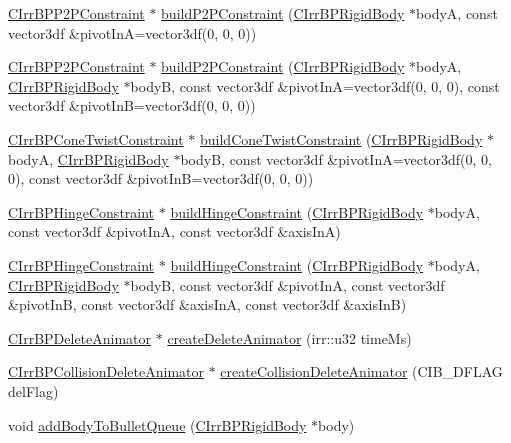 \begin{DoxyCompactItemize}
\item 
\hyperlink{class_c_irr_b_p_p2_p_constraint}{CIrrBPP2PConstraint} $\ast$ \hyperlink{class_c_irr_b_p_manager_a19a7a9108ded5c076d307efdb390d58a}{buildP2PConstraint} (\hyperlink{class_c_irr_b_p_rigid_body}{CIrrBPRigidBody} $\ast$bodyA, const vector3df \&pivotInA=vector3df(0, 0, 0))
\item 
\hyperlink{class_c_irr_b_p_p2_p_constraint}{CIrrBPP2PConstraint} $\ast$ \hyperlink{class_c_irr_b_p_manager_a1a2dc64a93a8770dfed3ba7f77972c70}{buildP2PConstraint} (\hyperlink{class_c_irr_b_p_rigid_body}{CIrrBPRigidBody} $\ast$bodyA, \hyperlink{class_c_irr_b_p_rigid_body}{CIrrBPRigidBody} $\ast$bodyB, const vector3df \&pivotInA=vector3df(0, 0, 0), const vector3df \&pivotInB=vector3df(0, 0, 0))
\item 
\hyperlink{class_c_irr_b_p_cone_twist_constraint}{CIrrBPConeTwistConstraint} $\ast$ \hyperlink{class_c_irr_b_p_manager_ae6c1ebbc11dec61a856bcc7b5c6394ce}{buildConeTwistConstraint} (\hyperlink{class_c_irr_b_p_rigid_body}{CIrrBPRigidBody} $\ast$bodyA, \hyperlink{class_c_irr_b_p_rigid_body}{CIrrBPRigidBody} $\ast$bodyB, const vector3df \&pivotInA=vector3df(0, 0, 0), const vector3df \&pivotInB=vector3df(0, 0, 0))
\item 
\hyperlink{class_c_irr_b_p_hinge_constraint}{CIrrBPHingeConstraint} $\ast$ \hyperlink{class_c_irr_b_p_manager_a87b2610eaba14775ac81992ff71ab436}{buildHingeConstraint} (\hyperlink{class_c_irr_b_p_rigid_body}{CIrrBPRigidBody} $\ast$bodyA, const vector3df \&pivotInA, const vector3df \&axisInA)
\item 
\hyperlink{class_c_irr_b_p_hinge_constraint}{CIrrBPHingeConstraint} $\ast$ \hyperlink{class_c_irr_b_p_manager_a8a61e921b487d6249e46022b6e9b5ccf}{buildHingeConstraint} (\hyperlink{class_c_irr_b_p_rigid_body}{CIrrBPRigidBody} $\ast$bodyA, \hyperlink{class_c_irr_b_p_rigid_body}{CIrrBPRigidBody} $\ast$bodyB, const vector3df \&pivotInA, const vector3df \&pivotInB, const vector3df \&axisInA, const vector3df \&axisInB)
\item 
\hyperlink{class_c_irr_b_p_delete_animator}{CIrrBPDeleteAnimator} $\ast$ \hyperlink{class_c_irr_b_p_manager_a34d992b091c917aa9a0febddadf26141}{createDeleteAnimator} (irr::u32 timeMs)
\item 
\hyperlink{class_c_irr_b_p_collision_delete_animator}{CIrrBPCollisionDeleteAnimator} $\ast$ \hyperlink{class_c_irr_b_p_manager_a868af77531e0eb62d14ee060d2c91158}{createCollisionDeleteAnimator} (CIB\_\-DFLAG delFlag)
\item 
void \hyperlink{class_c_irr_b_p_manager_af5b96f07769449e5b4a7adb8485e027f}{addBodyToBulletQueue} (\hyperlink{class_c_irr_b_p_rigid_body}{CIrrBPRigidBody} $\ast$body)

\end{DoxyCompactItemize}
